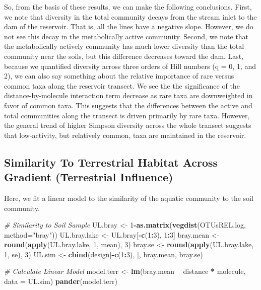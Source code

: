 \documentclass[]{article}
\newenvironment{Shaded}{\begin{snugshade}}{\end{snugshade}}
\newcommand{\KeywordTok}[1]{\textcolor[rgb]{0.13,0.29,0.53}{\textbf{#1}}}
\newcommand{\DataTypeTok}[1]{\textcolor[rgb]{0.13,0.29,0.53}{#1}}
\newcommand{\DecValTok}[1]{\textcolor[rgb]{0.00,0.00,0.81}{#1}}
\newcommand{\StringTok}[1]{\textcolor[rgb]{0.31,0.60,0.02}{#1}}
\newcommand{\CommentTok}[1]{\textcolor[rgb]{0.56,0.35,0.01}{\textit{#1}}}
\newcommand{\OperatorTok}[1]{\textcolor[rgb]{0.81,0.36,0.00}{\textbf{#1}}}
\newcommand{\NormalTok}[1]{#1}
\begin{document}
So, from the basis of these results, we can make the following
conclusions. First, we note that diversity in the total community decays
from the stream inlet to the dam of the reservoir. That is, all the
lines have a negative slope. However, we do not see this decay in the
metabolically active community. Second, we note that the metabolically
actively community has much lower diversity than the total community
near the soils, but this difference decreases toward the dam. Last,
because we quantified diversity across three orders of Hill numbers (q =
0, 1, and 2), we can also say something about the relative importance of
rare versus common taxa along the reservoir transect. We see the the
significance of the distance-by-molecule interaction term decrease as
rare taxa are downweighted in favor of common taxa. This suggests that
the differences between the active and total communities along the
transect is driven primarily by rare taxa. However, the general trend of
higher Simpson diversity across the whole transect suggests that
low-activity, but relatively common, taxa are maintained in the
reservoir.

\subsection{Similarity To Terrestrial Habitat Across Gradient
(Terrestrial
Influence)}\label{similarity-to-terrestrial-habitat-across-gradient-terrestrial-influence}

Here, we fit a linear model to the similarity of the aquatic community
to the soil community.

\begin{Shaded}
\begin{Highlighting}[]
\CommentTok{# Similarity to Soil Sample}
\NormalTok{UL.bray      <-}\StringTok{ }\DecValTok{1}\OperatorTok{-}\KeywordTok{as.matrix}\NormalTok{(}\KeywordTok{vegdist}\NormalTok{(OTUsREL.log, }\DataTypeTok{method=}\StringTok{"bray"}\NormalTok{))}
\NormalTok{UL.bray.lake <-}\StringTok{ }\NormalTok{UL.bray[}\OperatorTok{-}\KeywordTok{c}\NormalTok{(}\DecValTok{1}\OperatorTok{:}\DecValTok{3}\NormalTok{), }\DecValTok{1}\OperatorTok{:}\DecValTok{3}\NormalTok{] }
\NormalTok{bray.mean    <-}\StringTok{ }\KeywordTok{round}\NormalTok{(}\KeywordTok{apply}\NormalTok{(UL.bray.lake, }\DecValTok{1}\NormalTok{, mean), }\DecValTok{3}\NormalTok{)}
\NormalTok{bray.se      <-}\StringTok{ }\KeywordTok{round}\NormalTok{(}\KeywordTok{apply}\NormalTok{(UL.bray.lake, }\DecValTok{1}\NormalTok{, se), }\DecValTok{3}\NormalTok{)}
\NormalTok{UL.sim       <-}\StringTok{ }\KeywordTok{cbind}\NormalTok{(design[}\OperatorTok{-}\KeywordTok{c}\NormalTok{(}\DecValTok{1}\OperatorTok{:}\DecValTok{3}\NormalTok{), ], bray.mean, bray.se)}

\CommentTok{# Calculate Linear Model}
\NormalTok{model.terr <-}\StringTok{ }\KeywordTok{lm}\NormalTok{(bray.mean }\OperatorTok{~}\StringTok{ }\NormalTok{distance }\OperatorTok{*}\StringTok{ }\NormalTok{molecule, }\DataTypeTok{data =}\NormalTok{ UL.sim)}
\KeywordTok{pander}\NormalTok{(model.terr)}
\end{Highlighting}
\end{Shaded}
\end{document}
